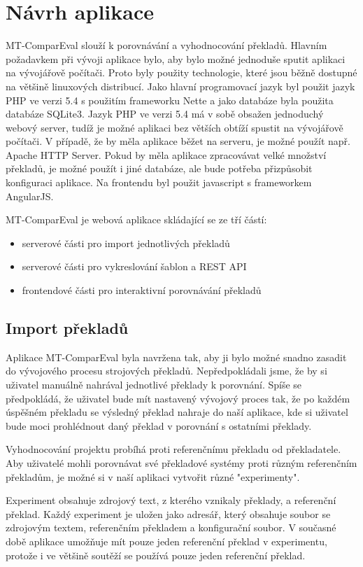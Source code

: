 \chapter{Návrh aplikace}
MT-ComparEval slouží k porovnávání a vyhodnocování překladů.
Hlavním požadavkem při vývoji aplikace bylo,
  aby bylo možné jednoduše sputit aplikaci na vývojářově počítači.
Proto byly použity technologie,
  které jsou běžně dostupné na většině linuxových distribucí.
Jako hlavní programovací jazyk byl použit jazyk PHP ve verzi 5.4 
  s použitím frameworku Nette
  a jako databáze byla použita databáze SQLite3.
Jazyk PHP ve verzi 5.4 má v sobě obsažen jednoduchý webový server,
  tudíž je možné aplikaci bez větších obtíží spustit na vývojářově počítači.
V případě, že by měla aplikace běžet na serveru,
  je možné použít např. Apache HTTP Server.
Pokud by měla aplikace zpracovávat velké množství překladů,
  je možné použít i jiné databáze,
  ale bude potřeba přizpůsobit konfiguraci aplikace.
Na frontendu byl použit javascript s frameworkem AngularJS.


MT-ComparEval je webová aplikace skládající se ze tří částí:

\begin{itemize}
	\item serverové části pro import jednotlivých překladů
	\item serverové části pro vykreslování šablon a REST API
	\item frontendové části pro interaktivní porovnávání překladů
\end{itemize}

\section{Import překladů}
Aplikace MT-ComparEval byla navržena tak,
  aby ji bylo možné snadno zasadit do vývojového procesu strojových překladů.
Nepředpokládali jsme,
  že by si uživatel manuálně nahrával jednotlivé překlady k porovnání.
Spíše se předpokládá, že uživatel bude mít nastavený vývojový proces tak,
  že po každém úspěšném překladu se výsledný překlad nahraje do naší aplikace,
  kde si uživatel bude moci prohlédnout daný překlad v porovnání s ostatními překlady.


Vyhodnocování projektu probíhá proti referenčnímu překladu od překladatele.
Aby uživatelé mohli porovnávat své překladové systémy proti různým referenčním překladům,
  je možné si v naší aplikaci vytvořit různé "experimenty". 

Experiment obsahuje zdrojový text, z kterého vznikaly překlady, a referenční překlad.
Každý experiment je uložen jako adresář,
  který obsahuje soubor se zdrojovým textem, referenčním překladem
  a konfigurační soubor.
V současné době aplikace umožňuje mít pouze jeden referenční překlad v experimentu,
  protože i ve většině soutěží se používá pouze jeden referenční překlad.


